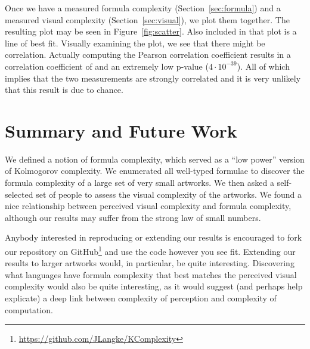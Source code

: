 \documentclass[11pt]{article}
\begin{document}
Once we have a measured formula complexity (Section~\ref{sec:formula}) and a
measured visual complexity (Section~\ref{sec:visual}), we plot them together.
The resulting plot may be seen in Figure~\ref{fig:scatter}.  Also included in
that plot is a line of best fit.  Visually examining the plot, we see that
there might be correlation.  Actually computing the Pearson correlation
coefficient results in a correlation coefficient of 
and an extremely low p-value ($4\cdot10^{-39}$).  All of which implies that the
two measurements are strongly correlated and it is very unlikely that this
result is due to chance.

\section{Summary and Future Work}

We defined a notion of formula complexity, which served as a ``low power''
version of Kolmogorov complexity.  We enumerated all well-typed formulae to
discover the formula complexity of a large set of very small artworks.  We then
asked a self-selected set of people to assess the visual complexity of the
artworks.  We found a nice relationship between perceived visual complexity and
formula complexity, although our results may suffer from the strong law of small
numbers\cite{smallnumbers}.

Anybody interested in reproducing or extending our results is encouraged to
fork our repository on
GitHub\footnote{\url{https://github.com/JLangke/KComplexity}} and use the code
however you see fit.  Extending our results to larger artworks would, in
particular, be quite interesting.  Discovering what languages have formula
complexity that best matches the perceived visual complexity would also be
quite interesting, as it would suggest (and perhaps help explicate) a deep link
between complexity of perception and complexity of computation.  

    
     
\end{document}
